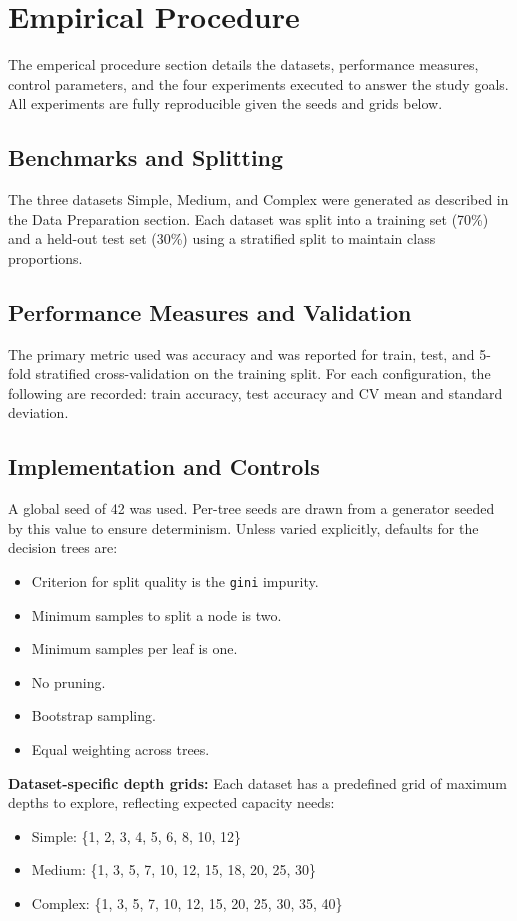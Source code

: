 \documentclass[conference]{IEEEtran}
\begin{document}
\section{Empirical Procedure}

The emperical procedure section details the datasets, performance measures, control parameters, and the four experiments executed to answer the study goals. All experiments are fully 
reproducible given the seeds and grids below.

\subsection{Benchmarks and Splitting}
The three datasets Simple, Medium, and Complex were generated as described in the Data Preparation section. Each dataset was split into a training set (70\%) and a held-out test set (30\%) using a stratified split to maintain class proportions.

\subsection{Performance Measures and Validation}
The primary metric used was accuracy and was reported for train, test, and 5-fold stratified cross-validation on the training split. For each configuration, the following are 
recorded: train accuracy, test accuracy and CV mean and standard deviation. 

\subsection{Implementation and Controls}
A global seed of 42 was used. Per-tree seeds are drawn from a generator seeded by this value to ensure determinism. Unless varied explicitly, defaults for the 
decision trees are:
\begin{itemize}
  \item Criterion for split quality is the \texttt{gini} impurity.
  \item Minimum samples to split a node is two.
  \item Minimum samples per leaf is one.
  \item No pruning.
  \item Bootstrap sampling.
  \item Equal weighting across trees.
\end{itemize}

\textbf{Dataset-specific depth grids:} Each dataset has a predefined grid of maximum depths to explore, reflecting expected capacity needs:
\begin{itemize}
  \item Simple: \{1, 2, 3, 4, 5, 6, 8, 10, 12\}
  \item Medium: \{1, 3, 5, 7, 10, 12, 15, 18, 20, 25, 30\}
  \item Complex: \{1, 3, 5, 7, 10, 12, 15, 20, 25, 30, 35, 40\}
\end{itemize}
\end{document}

